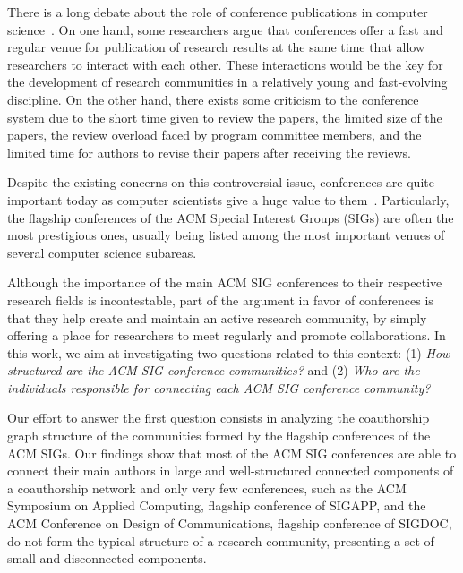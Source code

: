 \documentclass{sig-alternate-10pt}
\begin{document}
There is a long debate about the role of conference publications in computer science~\cite{Fortnow:cacm2009,Patterson:cacm2004,Vardi:cacm2009,Vardi:cacm2010,Vardi:cacm2014}. On one hand, some researchers argue that conferences offer a fast and regular venue for publication of research results at the same time that allow researchers to interact with each other. These interactions would be the key for the development of research communities in a relatively young and fast-evolving discipline. On the other hand, there exists some criticism to the conference system due to the short time given to review the papers, the limited size of the papers, the review overload faced by program committee members, and the limited time for authors to revise their papers after receiving the reviews.

Despite the existing concerns on this controversial is\-sue, conferences are quite important today as computer scientists give a huge value to them~\cite{Franceschet:cacm2010,Freyne:cacm2010,Laender:sigcse2008}. Particularly, the flagship conferences of the ACM Special Interest Groups (SIGs) are often the most prestigious ones, usually being listed among the most important venues of several computer science subareas.

Although the importance of the main ACM SIG conferences to their respective research fields is incontestable, part of the argument in favor of conferences is that they help create and maintain an active research community, by simply offering a place for researchers to meet regularly and promote collaborations. In this work, we aim at investigating two questions related to this context: (1) \textit{How structured are the ACM SIG conference communities?} and (2) \textit{Who are the individuals responsible for connecting each ACM SIG conference community?}

Our effort to answer the first question consists in analyzing the coauthorship graph structure of the communities formed by the flagship conferences of the ACM SIGs. Our findings show that most of the ACM SIG conferences are able to connect their main authors in large and well-structured connected components of a coauthorship network and only very few conferences, such as the ACM Symposium on Applied Computing, flagship conference of SIGAPP, and the ACM Conference on Design of Communications, flagship conference of SIGDOC, do not form the typical structure of a research community, presenting a set of small and disconnected components.
\end{document}
